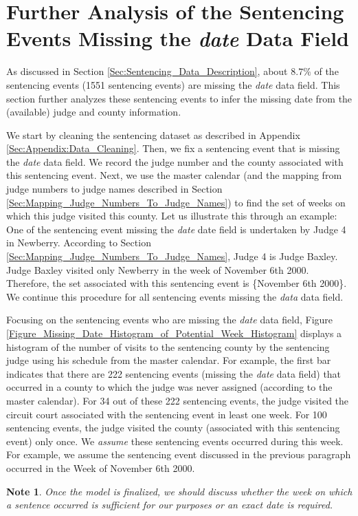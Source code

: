 \documentclass[11pt, oneside]{article}   	%
\theoremstyle{ModifiedStyle}
\newtheorem{note}{Note}
\begin{document}
\clearpage

\section{Further Analysis of the Sentencing Events Missing the \emph{date} Data Field}
\label{Sec:Appendix:Missing_Dates}
As discussed in Section \ref{Sec:Sentencing_Data_Description}, about $8.7\%$ of the sentencing events (1551 sentencing events) are missing the \emph{date} data field. This section further analyzes these sentencing events to infer the missing date from the (available) judge and county information.

We start by cleaning the sentencing dataset as described in Appendix \ref{Sec:Appendix:Data_Cleaning}. Then, we fix a sentencing event that is missing the \emph{date} data field. We record the judge number and the county associated with this sentencing event. Next, we use the master calendar (and the mapping from judge numbers to judge names described in Section \ref{Sec:Mapping_Judge_Numbers_To_Judge_Names}) to find the set of weeks on which this judge visited this county. Let us illustrate this through an example: One of the sentencing event missing the \emph{date} date field is undertaken by Judge 4 in Newberry. According to Section \ref{Sec:Mapping_Judge_Numbers_To_Judge_Names}, Judge 4 is Judge Baxley. Judge Baxley visited only Newberry in the week of November 6th 2000. Therefore, the set associated with this sentencing event is \{November 6th 2000\}. We continue this procedure for all sentencing events missing the \emph{data} data field.

Focusing on the sentencing events who are missing the \emph{date} data field, Figure \ref{Figure_Missing_Date_Histogram_of_Potential_Week_Histogram} displays a histogram of the number of visits to the sentencing county by the sentencing judge using his schedule from the master calendar. For example, the first bar indicates that there are 222 sentencing events (missing the \emph{date} data field) that occurred in a county to which the judge was never assigned (according to the master calendar). For 34 out of these 222 sentencing events, the judge visited the circuit court associated with the sentencing event in least one week. For 100 sentencing events, the judge visited the county (associated with this sentencing event) only once. We \emph{assume} these sentencing events occurred during this week. For example, we assume the sentencing event discussed in the previous paragraph occurred in the Week of November 6th 2000. 
%
\begin{note}
	Once the model is finalized, we should discuss whether the week on which a sentence occurred is sufficient for our purposes or an exact date is required. 
\end{note} 
\end{document}
